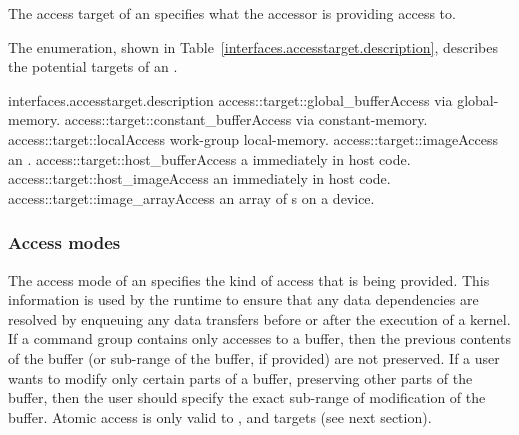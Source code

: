 The access target of an  specifies what the accessor is
providing access to.

The  enumeration, shown in
Table~\ref{interfaces.accesstarget.description}, describes the potential targets
of an .



{interfaces.accesstarget.description}
\addRow
    {access::target::global_buffer}{Access  via \gls{global-memory}.}
  \addRow
    {access::target::constant_buffer}{Access  via \gls{constant-memory}.}
  \addRow
    {access::target::local}{Access work-group \gls{local-memory}.}
  \addRow
    {access::target::image}{Access an .}
  \addRow
    {access::target::host_buffer}{Access a  immediately in host code.}
  \addRow
    {access::target::host_image}{Access an  immediately in host code.}
  \addRow
    {access::target::image_array}{Access an array of s on a device.}
\completeTable


\subsubsection{Access modes}
\label{sub.section.access.mode}

The access mode of an  specifies the kind of access that is
being provided. This information is used by the runtime to ensure that any
data dependencies are resolved by enqueuing any data transfers before
or after the execution of a kernel. If a command group contains only
 accesses to a buffer, then the previous contents
of the buffer (or sub-range of the buffer, if provided) are not
preserved. If a user wants to modify only certain parts of a buffer,
preserving other parts of the buffer, then the user should specify the
exact sub-range of modification of the buffer.
Atomic access is only valid to , 
and  targets (see next section).

